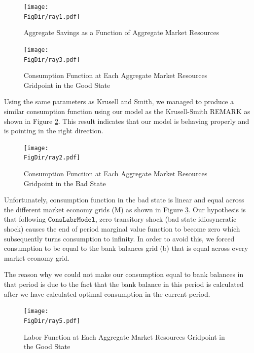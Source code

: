 \documentclass[titlepage,letterpaper]{\econtex}
\begin{document}
\begin{figure}[H]
      \centering
    \texttt{[image: \\FigDir/ray1.pdf]}
    \caption{Aggregate Savings as a Function of Aggregate Market Resources}
    \label{fig:agg_savings}
  \end{figure}

    \begin{figure}[H]
      \centering
        \texttt{[image: \\FigDir/ray3.pdf]}
        \caption{Consumption Function at Each Aggregate Market Resources Gridpoint in the Good State}
    \label{fig:good_consumption}
  \end{figure}

Using the same parameters as Krusell and Smith, we managed to produce a similar consumption function using our model as the Krusell-Smith REMARK as shown in Figure \ref{fig:good_consumption}. This result indicates that our model is behaving properly and is pointing in the right direction.  
  
    \begin{figure}[H]
      \centering
        \texttt{[image: \\FigDir/ray2.pdf]}
        \caption{Consumption Function at Each Aggregate Market Resources Gridpoint in the Bad State}
    \label{fig:bad_consumption}
  \end{figure}

Unfortunately, consumption function in the bad state is linear and equal across the different market economy grids (M) as shown in Figure \ref{fig:bad_consumption}. Our hypothesis is that following $\texttt{ConsLabrModel}$, zero transitory shock (bad state idiosyncratic shock) causes the end of period marginal value function to become zero which subsequently turns consumption to infinity. In order to avoid this, we forced consumption to be equal to the bank balances grid (b) that  is equal across every market economy grid. 

The reason why we could not make our consumption equal to bank balances in that period is due to the fact that the bank balance in this period is calculated after we have calculated optimal consumption in the current period.


\begin{figure}[H]
      \centering
      \texttt{[image: \\FigDir/ray5.pdf]}
      \caption{Labor Function at Each Aggregate Market Resources Gridpoint in the Good State}
    \label{fig:labor_good}
  \end{figure}
\end{document}
